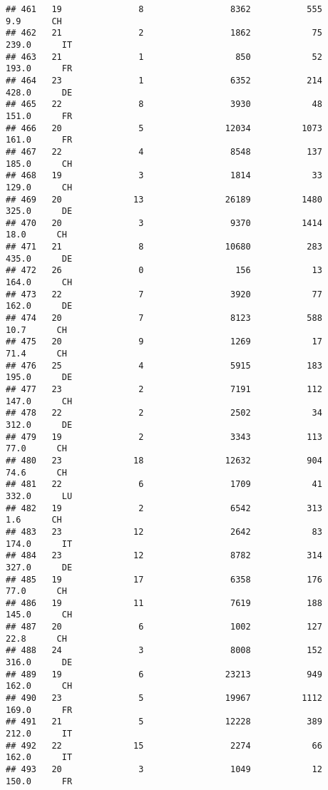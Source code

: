 \documentclass[
]{article}
\begin{document}
\begin{verbatim}
## 461   19               8                 8362           555      9.9      CH
## 462   21               2                 1862            75    239.0      IT
## 463   21               1                  850            52    193.0      FR
## 464   23               1                 6352           214    428.0      DE
## 465   22               8                 3930            48    151.0      FR
## 466   20               5                12034          1073    161.0      FR
## 467   22               4                 8548           137    185.0      CH
## 468   19               3                 1814            33    129.0      CH
## 469   20              13                26189          1480    325.0      DE
## 470   20               3                 9370          1414     18.0      CH
## 471   21               8                10680           283    435.0      DE
## 472   26               0                  156            13    164.0      CH
## 473   22               7                 3920            77    162.0      DE
## 474   20               7                 8123           588     10.7      CH
## 475   20               9                 1269            17     71.4      CH
## 476   25               4                 5915           183    195.0      DE
## 477   23               2                 7191           112    147.0      CH
## 478   22               2                 2502            34    312.0      DE
## 479   19               2                 3343           113     77.0      CH
## 480   23              18                12632           904     74.6      CH
## 481   22               6                 1709            41    332.0      LU
## 482   19               2                 6542           313      1.6      CH
## 483   23              12                 2642            83    174.0      IT
## 484   23              12                 8782           314    327.0      DE
## 485   19              17                 6358           176     77.0      CH
## 486   19              11                 7619           188    145.0      CH
## 487   20               6                 1002           127     22.8      CH
## 488   24               3                 8008           152    316.0      DE
## 489   19               6                23213           949    162.0      CH
## 490   23               5                19967          1112    169.0      FR
## 491   21               5                12228           389    212.0      IT
## 492   22              15                 2274            66    162.0      IT
## 493   20               3                 1049            12    150.0      FR

\end{verbatim}
\end{document}
